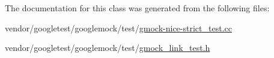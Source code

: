The documentation for this class was generated from the following files\+:\begin{DoxyCompactItemize}
\item 
vendor/googletest/googlemock/test/\hyperlink{gmock-nice-strict__test_8cc}{gmock-\/nice-\/strict\+\_\+test.\+cc}\item 
vendor/googletest/googlemock/test/\hyperlink{gmock__link__test_8h}{gmock\+\_\+link\+\_\+test.\+h}\end{DoxyCompactItemize}
